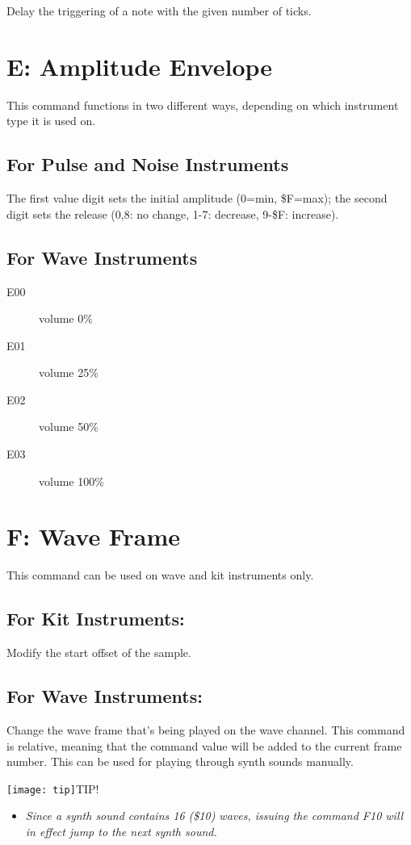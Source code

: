 Delay the triggering of a note with the given number of ticks.

\section{E: Amplitude Envelope}

This command functions in two different ways, depending on which instrument type it is used on.

\subsection{For Pulse and Noise Instruments}
The first value digit sets the initial amplitude (0=min, \$F=max); the second digit sets the release (0,8: no change, 1-7: decrease, 9-\$F: increase).

\subsection{For Wave Instruments}
\begin{description}
\item[E00] volume 0\%
\item[E01] volume 25\%
\item[E02] volume 50\%
\item[E03] volume 100\%
\end{description}

\section{F: Wave Frame}

This command can be used on wave and kit instruments only.

\subsection{For Kit Instruments:}
Modify the start offset of the sample.

\subsection{For Wave Instruments:}
Change the wave frame that's being played on the wave channel. This command is relative, meaning that the command value will be added to the current frame number. This can be used for playing through synth sounds manually.

\texttt{[image: tip]}TIP!
\begin{itemize}
        \item \textit{Since a synth sound contains 16 (\$10) waves, issuing the command \textsc{F10} will in effect jump to the next synth sound.}
	\end{itemize}

